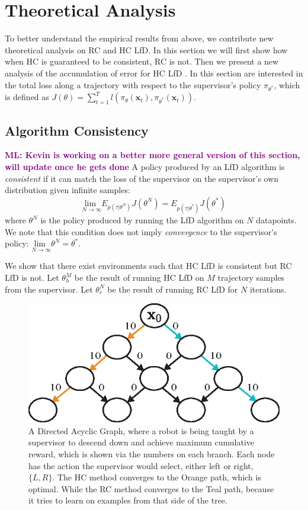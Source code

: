 \documentclass[10pt, conference]{ieeeconf}      %
\newcommand{\bx}{\mathbf{x}}
\newcommand{\ns}{HC LfD }
\newcommand{\nc}{RC LfD }
\newcommand{\mlnote}[1]{\ifthenelse{ \boolean{include-notes}}%
 {\textcolor{purple}{\textbf{ML: #1}}}{}}
\begin{document}
\section{Theoretical Analysis}
To better understand the empirical results from above, we contribute new theoretical analysis on RC and HC LfD. In this section we will first show how when HC is guaranteed to be consistent, RC is not.  Then we present a new analysis of the accumulation of error for  \ns. In this section are interested in the total loss along a trajectory with respect to the supervisor's policy $\pi_{\theta^*}$, which is defined as $J(\theta) = \sum^T_{t=1} l(\pi_{\theta}(\bx_{t}),\pi_{\theta^*}(\bx_{t}))$. 

\subsection{Algorithm Consistency}
\mlnote{Kevin is working on a better more general version of this section, will update once he gets done}
A policy produced by an LfD algorithm is {\it consistent} if it can match the loss of the supervisor on the supervisor's own distribution given infinite samples:
$$\underset{N \rightarrow \infty}{\text{lim }} E_{p(\tau|\theta^N)}J(\theta^N)  = E_{p(\tau|\theta^*)}J(\theta^*) $$
\noindent where $\theta^N$ is the policy produced by running the LfD algorithm on $N$ datapoints.
We note that this condition does not imply {\it convergence} to the supervisor's policy: $\underset{N \rightarrow \infty}{\text{lim }} \theta^N = \theta^*$.

We show that there exist environments such that \ns is consistent but \nc is not.
Let $\theta_{h}^M$ be the result of running \ns on $M$ trajectory samples from the supervisor.
Let $\theta_{r}^N$ be the result of running \nc for $N$ iterations.

\begin{figure}
\centering
\includegraphics{f_figs/counter_exmp.eps}
\caption{
    \footnotesize
A Directed Acyclic Graph, where a robot is being taught by a supervisor to descend down and achieve maximum cumulative reward, which is shown via the numbers on each branch. Each node has the action the supervisor would select, either left or right, $\lbrace L, R \rbrace$. The HC method converges to the Orange path, which is optimal. While the RC method converges to the Teal path, because it tries to learn on examples from that side of the tree.}
\vspace*{-20pt}
\label{fig:c_ex}
\end{figure}
\end{document}
